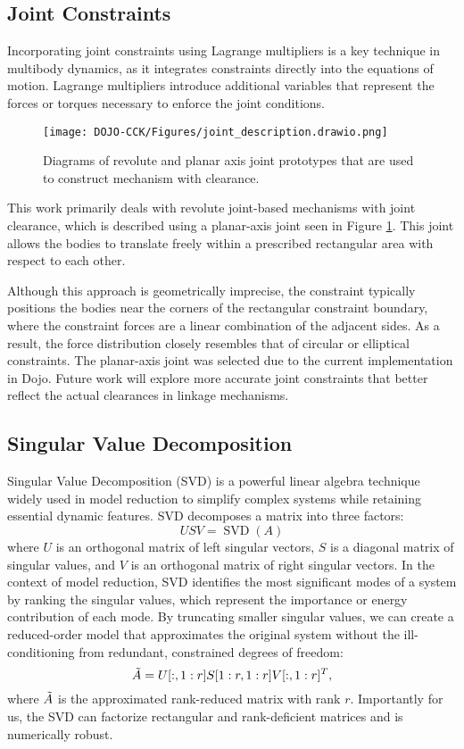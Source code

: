 \subsection{Joint Constraints}
Incorporating joint constraints using Lagrange multipliers is a key technique in multibody dynamics, as it integrates constraints directly into the equations of motion. Lagrange multipliers introduce additional variables that represent the forces or torques necessary to enforce the joint conditions.
\begin{figure}
    \centering
    \texttt{[image: DOJO-CCK/Figures/joint\_description.drawio.png]}
    \caption{Diagrams of revolute and planar axis joint prototypes that are used to construct mechanism with clearance.}
    \label{fig:joint-proto}
\end{figure}
This work primarily deals with revolute joint-based mechanisms with joint clearance,  which is described using a planar-axis joint seen in Figure \ref{fig:joint-proto}. This joint allows the bodies to translate freely within a prescribed rectangular area with respect to each other. 

Although this approach is geometrically imprecise, the constraint typically positions the bodies near the corners of the rectangular constraint boundary, where the constraint forces are a linear combination of the adjacent sides. As a result, the force distribution closely resembles that of circular or elliptical constraints. The planar-axis joint was selected due to the current implementation in Dojo. Future work will explore more accurate joint constraints that better reflect the actual clearances in linkage mechanisms.

\subsection{Singular Value Decomposition}\label{sec:svd}
Singular Value Decomposition (SVD) is a powerful linear algebra technique widely used in model reduction to simplify complex systems while retaining essential dynamic features. SVD decomposes a matrix into three factors: 
\begin{equation}
    USV = \operatorname{SVD}(A)
\end{equation}
where $U$ is an orthogonal matrix of left singular vectors, $S$ is a diagonal matrix of singular values, and $V$ is an orthogonal matrix of right singular vectors. In the context of model reduction, SVD identifies the most significant modes of a system by ranking the singular values, which represent the importance or energy contribution of each mode. By truncating smaller singular values, we can create a reduced-order model that approximates the original system without the ill-conditioning from redundant, constrained degrees of freedom:
\begin{equation}
    \Tilde{A} = U[:, 1:r]S[1:r, 1:r]V[:,1:r]^T ,
\end{equation}
where $\Tilde{A}$ is the approximated rank-reduced matrix with rank $r$. Importantly for us, the SVD can factorize rectangular and rank-deficient matrices and is numerically robust.  

